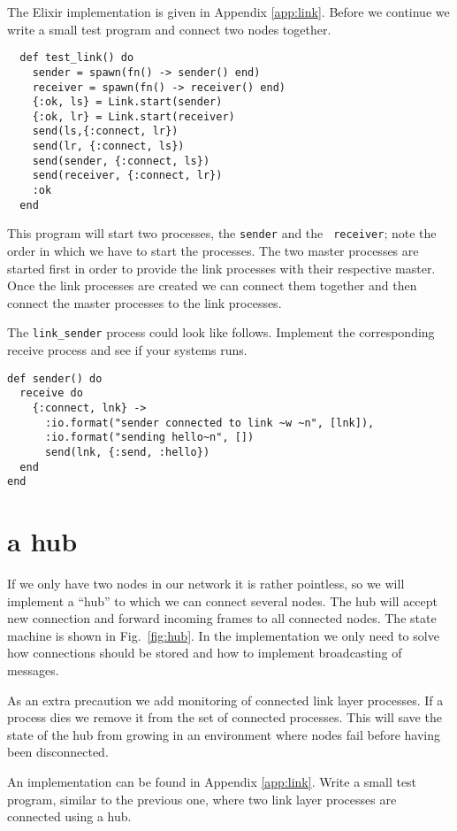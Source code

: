 \documentclass[a4paper,11pt]{article}
\begin{document}
The Elixir implementation is given in Appendix \ref{app:link}. Before
we continue we write a small test program and connect two nodes
together.

\begin{lstlisting}
  def test_link() do
    sender = spawn(fn() -> sender() end)
    receiver = spawn(fn() -> receiver() end)
    {:ok, ls} = Link.start(sender)
    {:ok, lr} = Link.start(receiver)
    send(ls,{:connect, lr})
    send(lr, {:connect, ls})
    send(sender, {:connect, ls})
    send(receiver, {:connect, lr})
    :ok
  end
\end{lstlisting}  

This program will start two processes, the {\tt sender} and the {\tt
  receiver};  note the order in which we have to start the
processes. The two master processes are started first in order to
provide the link processes with their respective master. Once the link
processes are created we can connect them together and then connect
the master processes to the link processes.

The {\tt link\_sender} process could look like follows. Implement the
corresponding receive process and see if your systems runs.

\begin{lstlisting}
def sender() do
  receive do
    {:connect, lnk} ->
      :io.format("sender connected to link ~w ~n", [lnk]),
      :io.format("sending hello~n", [])
      send(lnk, {:send, :hello})
  end
end            
\end{lstlisting}

\section{a hub}

If we only have two nodes in our network it is rather pointless, so we
will implement a ``hub'' to which we can connect several nodes. The
hub will accept new connection and forward incoming frames to all
connected nodes. The state machine is shown in Fig.~\ref{fig:hub}. In
the implementation we only need to solve how connections should be
stored and how to implement broadcasting of messages.

As an extra precaution we add monitoring of connected link layer processes. If a
process dies we remove it from the set of connected
processes. This will save the state of the hub from growing in an
environment where nodes fail before having been disconnected.

An implementation can be found in Appendix \ref{app:link}. Write a
small test program, similar to the previous one, where two link layer
processes are connected using a hub.
\end{document}
